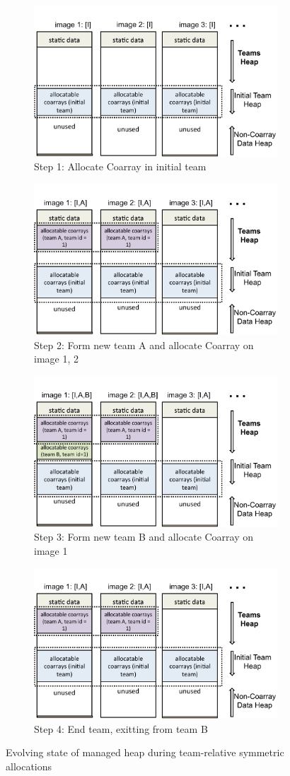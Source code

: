 \begin{figure}[!h]
\centering
\begin{subfigure}{\textwidth}
	\centering
	\includegraphics[width=.55\linewidth]{figures/memory_step1_nt}
	\caption{Step 1: Allocate Coarray in initial team}
	\label{fig:mm_step1}
\end{subfigure}
\begin{subfigure}{\textwidth}
	\centering
	\includegraphics[width=.55\linewidth]{figures/memory_step2_nt}
	\caption{Step 2: Form new team A and allocate Coarray on image 1, 2}
	\label{fig:mm_step2}
\end{subfigure}
\begin{subfigure}{\textwidth}
	\centering
	\includegraphics[width=.55\linewidth]{figures/memory_step3_nt}
	\caption{Step 3: Form new team B and allocate Coarray on image 1}
	\label{fig:mm_step3}
\end{subfigure}
\begin{subfigure}{\textwidth}
	\centering
	\includegraphics[width=.55\linewidth]{figures/memory_step4_nt}
	\caption{Step 4: End team, exitting from team B}
	\label{fig:mm_step4}
\end{subfigure}
\caption{Evolving state of managed heap during team-relative
symmetric allocations}
\label{fig:memory-steps}
\end{figure}


